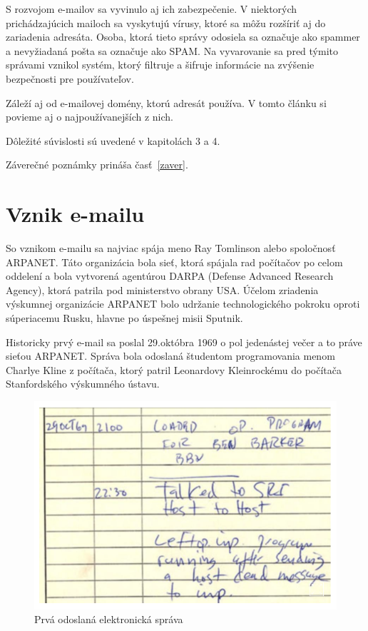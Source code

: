 \documentclass[10pt,slovak,twoside,a4paper]{article}
\begin{document}
S rozvojom e-mailov sa vyvinulo aj ich zabezpečenie. V niektorých prichádzajúcich mailoch sa vyskytujú vírusy, ktoré sa môžu rozšíriť aj do zariadenia adresáta. Osoba, ktorá tieto správy odosiela sa označuje ako spammer a nevyžiadaná pošta sa označuje ako SPAM. Na vyvarovanie sa pred týmito správami vznikol systém, ktorý filtruje a šifruje informácie na zvýšenie bezpečnosti pre používateľov. 

Záleží aj od e-mailovej domény, ktorú adresát používa. V tomto článku si povieme aj o najpoužívanejších z nich. 

Dôležité súvislosti sú uvedené v kapitolách 3 a 4.

Záverečné poznámky prináša časť~\ref{zaver}.

\newpage

\section{Vznik e-mailu} 

So vznikom e-mailu sa najviac spája meno Ray Tomlinson alebo spoločnosť ARPANET. Táto organizácia bola sieť, ktorá spájala rad počítačov po celom oddelení a bola vytvorená agentúrou DARPA (Defense Advanced Research Agency), ktorá patrila pod ministerstvo obrany USA. Účelom zriadenia výskumnej organizácie ARPANET bolo udržanie technologického pokroku oproti súperiacemu Rusku, hlavne po úspešnej misii Sputnik.

Historicky prvý e-mail sa poslal 29.októbra 1969 o pol jedenástej večer a to práve sieťou ARPANET. Správa bola odoslaná študentom programovania menom Charlye Kline z počítača, ktorý patril Leonardovy Kleinrockému do počítača Stanfordského výskumného ústavu. 

\begin{figure}[tbh]
\centering
\includegraphics[scale=0.40]{firstmessage.png}
\caption{Prvá odoslaná elektronická správa \cite{UPI}}
\end{figure}
\end{document}
